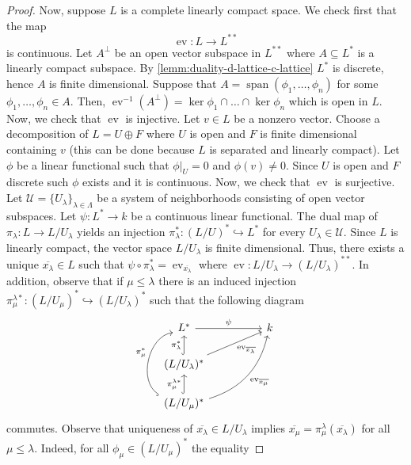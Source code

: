 \begin{proof}
	Now, suppose $L$ is a complete linearly compact space. We check first that the map 
	\[
		\operatorname{ev}\colon L \to L^{**}
	\]
	is continuous. Let $A^{\perp}$ be an open vector subspace in $L^{**}$ where $A \subseteq L^{*}$ is a linearly compact subspace. By \cref{lemm:duality-d-lattice-c-lattice} $L^{*}$ is discrete, hence $A$ is finite dimensional. Suppose that $A = \operatorname{span}(\phi_{1},\ldots,\phi_{n})$ for some $\phi_{1},\ldots,\phi_{n} \in A$. Then, $\operatorname{ev}^{-1}(A^{\perp}) = \ker \phi_{1} \cap \ldots \cap \ker \phi_{n}$ which is open in $L$. Now, we check that $\operatorname{ev}$ is injective. Let $v \in L$ be a nonzero vector. Choose a decomposition of $L = U \oplus F$ where $U$ is open and $F$ is finite dimensional containing $v$ (this can be done because $L$ is separated and linearly compact). Let $\phi$ be a linear functional such that $\phi\lvert_{U} = 0$ and $\phi(v) \neq 0$. Since $U$ is open and $F$ discrete such $\phi$ exists and it is continuous. Now, we check that $\operatorname{ev}$ is surjective. Let $\mathscr{U} = \{U_{\lambda}\}_{\lambda\in \Lambda}$ be a system of neighborhoods consisting of open vector subspaces. Let $\psi\colon L^{*} \to k$ be a continuous linear functional. The dual map of $\pi_{\lambda}\colon L \to L/U_{\lambda}$ yields an injection $\pi_{\lambda}^{*}\colon(L/U)^{*} \hookrightarrow L^{*}$ for every $U_{\lambda} \in \mathscr{U}$. Since $L$ is linearly compact, the vector space $L/U_{\lambda}$ is finite dimensional. Thus, there exists a unique $\overline{x_{\lambda}}\in L$ such that $\psi \circ \pi_{\lambda}^{*} = \operatorname{ev}_{\overline{x_{\lambda}}}$ where $\operatorname{ev}\colon L/U_{\lambda} \to (L/U_{\lambda})^{**}$. In addition, observe that if $\mu\leq \lambda $ there is an induced injection $\pi_{\mu}^{\lambda*}\colon(L/U_{\mu})^{*} \hookrightarrow (L/U_{\lambda})^{*}$ such that the following diagram
	\[
	\begin{tikzcd}
		L^{*} \arrow[rr, "\psi"] & & k \\
		(L/U_{\lambda})^{*} \arrow[u, hook, "\pi_{\lambda}^{*}"] \arrow[urr, swap, "\operatorname{ev}_{\overline{x_{\lambda}}}"] & & \\
		(L/U_{\mu})^{*} \arrow[u, hook, "\pi_{\mu}^{\lambda*}"] \arrow[uurr, swap, bend right, "\operatorname{ev}_{\overline{x_{\mu}}}"] \arrow[uu, bend left = 70, hook, "\pi_{\mu}^{*}"]& & 
	\end{tikzcd}
	\]
	commutes. Observe that uniqueness of $\overline{x_{\lambda}} \in L/U_{\lambda}$ implies $\overline{x_\mu} = \pi_{\mu}^{\lambda}(\overline{x_{\lambda}})$ for all $\mu \leq \lambda$. Indeed, for all $\phi_{\mu}\in(L/U_{\mu})^{*}$ the equality

\end{proof}

